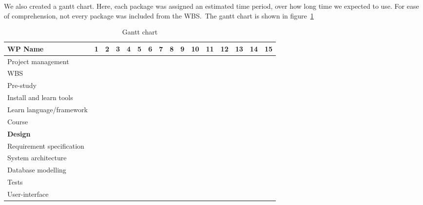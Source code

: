 We also created a gantt chart. Here, each package was assigned an
estimated time period, over how long time we expected to use. For ease
of comprehension, not every package was included from the WBS.\ The
gantt chart is shown in figure~\ref{gantt}
\newline
\begin{table}
\caption{Gantt chart}
\label{gantt}
\begin{tabular}{|l|l|l|l|l|l|l|l|l|l|l|l|l|l|l|l|}
\hline
\textbf{WP Name} & 1 & 2 & 3 & 4 & 5 & 6 & 7 & 8 & 9 & 10 & 11 & 12 & 13 & 14 & 15 \\
\hline
Project management &\rowcolor{ForestGreen}&&&&&&&&&&&&&& \\
\hline
WBS &&&&&&&&&&&&&&& \\
\hline
Pre-study
&\cellcolor{yellow}&\cellcolor{yellow}&\cellcolor{yellow}&\cellcolor{yellow}&&&&&&&&&&&
\\ \hline
Install and learn tools&\cellcolor{Dandelion}&\cellcolor{Dandelion}&\cellcolor{Dandelion}&\cellcolor{Dandelion}&&&&&&&&&&& \\
\hline
Learn language/framework&&\cellcolor{Dandelion}&\cellcolor{Dandelion}&\cellcolor{Dandelion}&&&&&&&&&&&  \\
\hline
Course &&\cellcolor{Dandelion}&\cellcolor{Dandelion}&&&&&&&&&&&&  \\
\hline
\textbf{Design} & &\cellcolor{MidnightBlue} &\cellcolor{MidnightBlue} &\cellcolor{MidnightBlue} &\cellcolor{MidnightBlue} &\cellcolor{MidnightBlue} &\cellcolor{MidnightBlue} &\cellcolor{MidnightBlue} &\cellcolor{MidnightBlue} &\cellcolor{MidnightBlue} & & & & & \\ \hline
Requirement specification&&\cellcolor{RoyalBlue}&\cellcolor{RoyalBlue}&\cellcolor{RoyalBlue}&\cellcolor{RoyalBlue}&\cellcolor{RoyalBlue}&\cellcolor{RoyalBlue}&\cellcolor{RoyalBlue}&\cellcolor{RoyalBlue}&\cellcolor{RoyalBlue}&&&&&  \\
\hline
System architecture&&&\cellcolor{RoyalBlue}&\cellcolor{RoyalBlue}&\cellcolor{RoyalBlue}&\cellcolor{RoyalBlue}&\cellcolor{RoyalBlue}&&&&&&&&  \\
\hline
Database modelling&&&\cellcolor{RoyalBlue}&\cellcolor{RoyalBlue}&\cellcolor{RoyalBlue}&\cellcolor{RoyalBlue}&&&&&&&&&  \\
\hline
Tests &&&\cellcolor{RoyalBlue}&\cellcolor{RoyalBlue}&\cellcolor{RoyalBlue}&\cellcolor{RoyalBlue}&&&&&&&&&  \\
\hline
User-interface&&&&&\cellcolor{MidnightBlue}&\cellcolor{MidnightBlue}&\cellcolor{MidnightBlue}&\cellcolor{MidnightBlue}&\cellcolor{MidnightBlue}&&&&&&  \\

\end{tabular}
\end{table}
